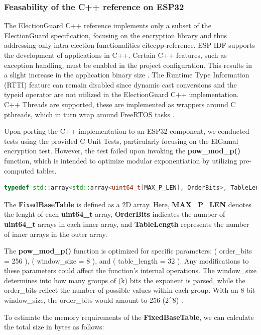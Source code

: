 \subsubsection{Feasability of the C++ reference on ESP32}
The ElectionGuard C++ reference implements only a subset of the ElectionGuard specification, focusing on the encryption library and thus addressing only intra-election functionalities cite{cpp-reference}. ESP-IDF supports the development of applications in C++. Certain C++ features, such as exception handling, must be enabled in the project configuration. This results in a slight increase in the application binary size \cite{esp-prog}. The Runtime Type Information (RTTI) feature can remain disabled since dynamic cast conversions and the typeid operator are not utilized in the ElectionGuard C++ implementation. C++ Threads are supported, these are implemented as wrappers around C pthreads, which in turn wrap around FreeRTOS tasks \cite{esp-prog}.

Upon porting the C++ implementation to an ESP32 component, we conducted tests using the provided C Unit Tests, particularly focusing on the ElGamal encryption test. However, the test failed upon invoking the \textbf{pow\_mod\_p()} function, which is intended to optimize modular exponentiation by utilizing pre-computed tables.

\begin{lstlisting}[language=C++, caption={FixedBaseTable Definition}]
    typedef std::array<std::array<uint64_t[MAX_P_LEN], OrderBits>, TableLength> FixedBaseTable;
\end{lstlisting}

The \textbf{FixedBaseTable} is defined as a 2D array. Here, \textbf{MAX\_P\_LEN} denotes the lenght of each \textbf{uint64\_t} array, \textbf{OrderBits} indicates the number of \textbf{uint64\_t} arrays in each inner array, and \textbf{TableLength} represents the number of inner arrays in the outer array.

The \textbf{pow\_mod\_p()} function is optimized for specific parameters: ( order\_bits = 256 ), ( window\_size = 8 ), and ( table\_length = 32 ). Any modifications to these parameters could affect the function's internal operations. The window\_size determines into how many groups of (k) bits the exponent is parsed, while the order\_bits reflect the number of possible values within each group. With an 8-bit window\_size, the order\_bits would amount to 256 (2^8) \cite[22]{eg-spec}.

To estimate the memory requirements of the \textbf{FixedBaseTable}, we can calculate the total size in bytes as follows:	


